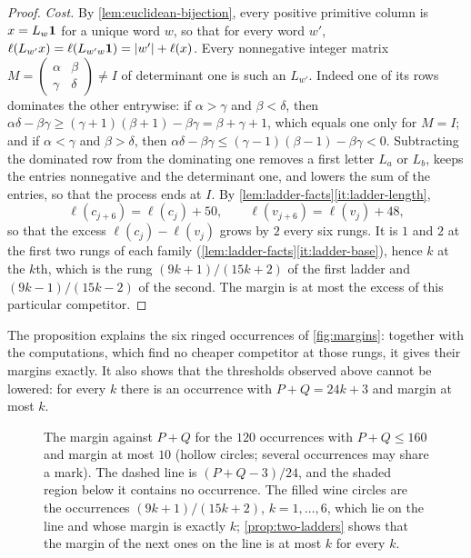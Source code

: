 \begin{proof}
\emph{Cost.} By \cref{lem:euclidean-bijection}, every positive primitive
column is $x=L_w{\bf1}$ for a unique word $w$, so that for every word $w'$,
$\ell(L_{w'}x)=\ell(L_{w'w}{\bf1})=\lvert w'\rvert+\ell(x)$. Every nonnegative integer
matrix $M=\left(\begin{smallmatrix}\alpha&\beta\\\gamma&\delta\end{smallmatrix}\right)\neq I$
of determinant one is such an $L_{w'}$. Indeed one of its rows dominates the
other entrywise: if $\alpha>\gamma$ and $\beta<\delta$, then
$\alpha\delta-\beta\gamma\geqslant(\gamma+1)(\beta+1)-\beta\gamma=\beta+\gamma+1$, which equals one
only for $M=I$; and if $\alpha<\gamma$ and $\beta>\delta$, then
$\alpha\delta-\beta\gamma\leqslant(\gamma-1)(\beta-1)-\beta\gamma<0$. Subtracting the dominated
row from the dominating one removes a first letter $L_a$ or $L_b$, keeps the
entries nonnegative and the determinant one, and lowers the sum of the
entries, so that the process ends at $I$. By \cref{lem:ladder-facts}\ref{it:ladder-length},
$$
 \ell(c_{j+6})=\ell(c_j)+50,\qquad \ell(v_{j+6})=\ell(v_j)+48,
$$
so that the excess $\ell(c_j)-\ell(v_j)$ grows by $2$ every six rungs. It is
$1$ and $2$ at the first two rungs of each family
(\cref{lem:ladder-facts}\ref{it:ladder-base}), hence $k$ at the $k$th, which is the rung
$(9k+1)/(15k+2)$ of the first ladder and $(9k-1)/(15k-2)$ of the second.
The margin is at most the excess of this particular competitor.
\end{proof}

The proposition explains the six ringed occurrences of \cref{fig:margins}:
together with the computations, which find no cheaper competitor at those
rungs, it gives their margins exactly. It also shows that the thresholds
observed above cannot be lowered: for every $k$ there is an occurrence with
$P+Q=24k+3$ and margin at most $k$.

\begin{figure}[tb]
\centering

\caption{The margin against $P+Q$ for the $120$ occurrences with
$P+Q\leqslant160$ and margin at most $10$ (hollow circles; several
occurrences may share a mark). The dashed line is $(P+Q-3)/24$, and the
shaded region below it contains no occurrence. The filled wine circles are
the occurrences $(9k+1)/(15k+2)$, $k=1,\dots,6$, which lie on the line and
whose margin is exactly $k$; \cref{prop:two-ladders} shows that the margin
of the next ones on the line is at most $k$ for every $k$.}
\label{fig:thresholds}
\end{figure}

